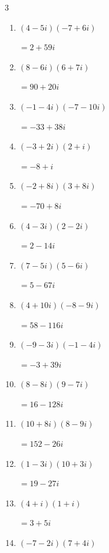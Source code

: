 \begin{multicols}{3}
\begin{enumerate}
  \item $\displaystyle (4-5i)(-7+6i)$

        $\displaystyle =2+59i$

  \item $\displaystyle (8-6i)(6+7i)$

        $\displaystyle =90+20i$

  \item $\displaystyle (-1-4i)(-7-10i)$

        $\displaystyle =-33+38i$

  \item $\displaystyle (-3+2i)(2+i)$

        $\displaystyle =-8+i$

  \item $\displaystyle (-2+8i)(3+8i)$

        $\displaystyle =-70+8i$

  \item $\displaystyle (4-3i)(2-2i)$

        $\displaystyle =2-14i$

  \item $\displaystyle (7-5i)(5-6i)$

        $\displaystyle =5-67i$

  \item $\displaystyle (4+10i)(-8-9i)$

        $\displaystyle =58-116i$

  \item $\displaystyle (-9-3i)(-1-4i)$

        $\displaystyle =-3+39i$

  \item $\displaystyle (8-8i)(9-7i)$

        $\displaystyle =16-128i$

  \item $\displaystyle (10+8i)(8-9i)$

        $\displaystyle =152-26i$

  \item $\displaystyle (1-3i)(10+3i)$

        $\displaystyle =19-27i$

\columnbreak %

  \item $\displaystyle (4+i)(1+i)$

        $\displaystyle =3+5i$

  \item $\displaystyle (-7-2i)(7+4i)$


\end{enumerate}
\end{multicols}
